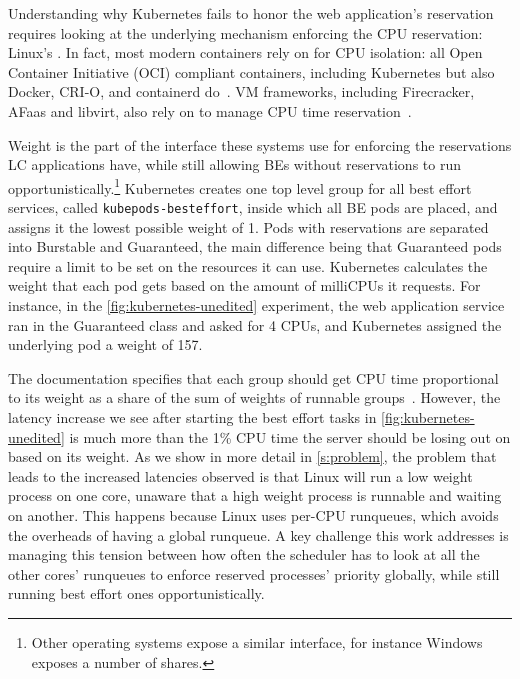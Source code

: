 
Understanding why Kubernetes fails to honor the web application's reservation
requires looking at the underlying mechanism enforcing the CPU reservation:
Linux's \cgroups{}. In fact, most modern containers rely on \cgroups{} for CPU
isolation: all Open Container Initiative (OCI) compliant containers, including
Kubernetes but also Docker, CRI-O, and containerd
do~\cite{oci-cgroups,docker-docs-cgroups,container-isolation-article}. VM
frameworks, including Firecracker, AFaas and libvirt, also rely on \cgroups{} to
manage CPU time reservation~\cite{firecracker-cgroups,afaas,libvirt-cgroups}.

Weight is the part of the \cgroups{} interface these systems use for enforcing
the reservations LC applications have, while still allowing BEs without
reservations to run opportunistically.\footnote{Other operating systems expose a
similar interface, for instance Windows exposes a number of shares.} Kubernetes
creates one top level group for all best effort services, called
\texttt{kubepods-besteffort}, inside which all BE pods are placed, and assigns
it the lowest possible weight of 1. Pods with reservations are separated into
Burstable and Guaranteed, the main difference being that Guaranteed pods require
a limit to be set on the resources it can use. Kubernetes calculates the weight
that each pod gets based on the amount of milliCPUs it requests. For instance,
in the \autoref{fig:kubernetes-unedited} experiment, the web application service
ran in the Guaranteed class and asked for 4 CPUs, and Kubernetes assigned the
underlying pod a weight of 157.

The \cgroups{} documentation specifies that each group should get CPU time
proportional to its weight as a share of the sum of weights of runnable
groups~\cite{cgroups-kerneldocs}. However, the latency increase we see after
starting the best effort tasks in \autoref{fig:kubernetes-unedited} is much more
than the 1\% CPU time the server should be losing out on based on its weight. As
we show in more detail in \autoref{s:problem}, the problem that leads to the
increased latencies observed is that Linux will run a low weight process on one
core, unaware that a high weight process is runnable and waiting on another.
This happens because Linux uses per-CPU runqueues, which avoids the overheads of
having a global runqueue. A key challenge this work addresses is managing this
tension between how often the scheduler has to look at all the other cores'
runqueues to enforce reserved processes' priority globally, while still running
best effort ones opportunistically.

